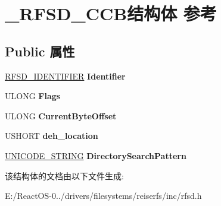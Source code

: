 \hypertarget{struct___r_f_s_d___c_c_b}{}\section{\+\_\+\+R\+F\+S\+D\+\_\+\+C\+C\+B结构体 参考}
\label{struct___r_f_s_d___c_c_b}
\subsection*{Public 属性}
\begin{DoxyCompactItemize}
\item 
\mbox{\label{struct___r_f_s_d___c_c_b_ada76f87e11f0f6d99ac5525c3012946e}} 
\hyperlink{struct___r_f_s_d___i_d_e_n_t_i_f_i_e_r}{R\+F\+S\+D\+\_\+\+I\+D\+E\+N\+T\+I\+F\+I\+ER} {\bfseries Identifier}
\item 
\mbox{\label{struct___r_f_s_d___c_c_b_a97c4c41c2fdec9839cc5eaadacb085fb}} 
U\+L\+O\+NG {\bfseries Flags}
\item 
\mbox{\label{struct___r_f_s_d___c_c_b_af767b37b0714755ea6729ddc16c3aad9}} 
U\+L\+O\+NG {\bfseries Current\+Byte\+Offset}
\item 
\mbox{\label{struct___r_f_s_d___c_c_b_a9e2a665009c61bfb89a249dbb509200f}} 
U\+S\+H\+O\+RT {\bfseries deh\+\_\+location}
\item 
\mbox{\label{struct___r_f_s_d___c_c_b_a2d7b51ab0fe8e258bc862860e1350646}} 
\hyperlink{struct___u_n_i_c_o_d_e___s_t_r_i_n_g}{U\+N\+I\+C\+O\+D\+E\+\_\+\+S\+T\+R\+I\+NG} {\bfseries Directory\+Search\+Pattern}
\end{DoxyCompactItemize}


该结构体的文档由以下文件生成\+:\begin{DoxyCompactItemize}
\item 
E\+:/\+React\+O\+S-\/0../drivers/filesystems/reiserfs/inc/rfsd.\+h\end{DoxyCompactItemize}
